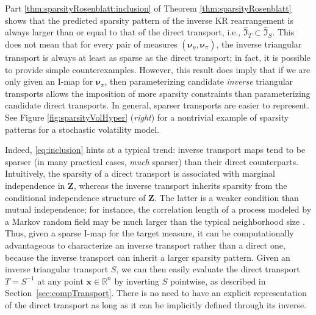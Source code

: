 \documentclass[twoside,11pt]{article}
\newcommand{\genm}{\boldsymbol{\nu} }   %
\newcommand{\re}{\mathbb{R}}
\newcommand{\xb}{\boldsymbol{x}}
\newcommand{\Zb}{\boldsymbol{Z}}
\newcommand{\sparse}{ \mathfrak{I} }
\begin{document}
Part \ref{thm:sparsityRosenblatt:inclusion} of Theorem
\ref{thm:sparsityRosenblatt} shows that the predicted sparsity pattern
of the inverse KR rearrangement is always larger than
or equal to that of the direct transport, i.e.,
$\widehat{\sparse}_T \subset \widehat{\sparse}_S $.  This does not
mean that for every pair of measures $(\genm_\eta, \genm_\pi)$, the inverse
triangular transport is always at least as sparse as the direct
transport; in fact, it is possible to provide simple counterexamples.
%
%
%
%
%
However, this result does imply that if we are only given an I-map for
$\genm_\pi$, then parameterizing candidate \textit{inverse} triangular transports
allows the imposition of more sparsity constraints than parameterizing
candidate direct transports. 
%
%
%
In general, sparser transports are easier to represent.
See Figure \ref{fig:sparsityVolHyper} ({\it right}) for a nontrivial
example of sparsity patterns for a stochastic volatility model.

Indeed, \eqref{eq:inclusion} hints at a typical trend: inverse
transport maps tend to be sparser (in many practical cases, \textit{much}
sparser) than their direct counterparts. Intuitively, the sparsity of
a direct transport is %
associated with
marginal independence in $\Zb$, 
%
%
whereas the inverse transport inherits sparsity from
the conditional independence structure of $\Zb$.
%
The latter is a weaker condition
than mutual independence;
%
for instance, the correlation length of a process modeled by a Markov
random field may be much larger than the typical neighborhood size
\citep{rue2005gaussian}. 
%
%
%
%
%
%
%
%
%
%
%
%
%
%
%
Thus, given a sparse I-map for the target measure, it can be
computationally advantageous to characterize an inverse transport rather
than a direct one,
%
because the inverse transport can inherit a
larger sparsity pattern.  Given an inverse triangular transport $S$,
we can then easily evaluate the direct transport $T = S^{-1}$ at any point
$\xb\in\re^n$ by inverting $S$ pointwise, as described in Section~\ref{sec:compTransport}. There is no
need to have an explicit representation of the direct transport as
long as it can be implicitly defined through its inverse.
\end{document}
